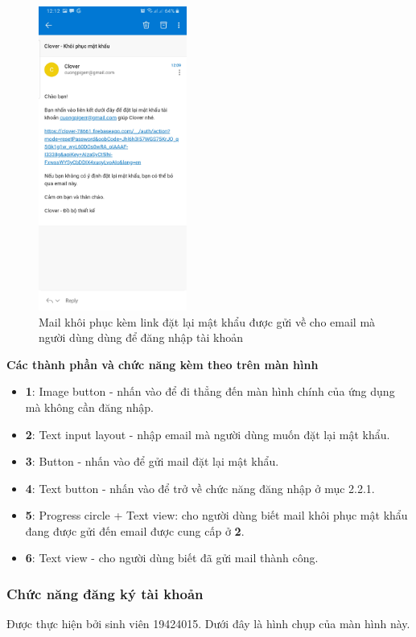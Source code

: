 \documentclass[12pt]{article}
\begin{document}
\begin{figure}[H]
    \centering
    \includegraphics[height=10cm]{images/09.png}
    \caption{Mail khôi phục kèm link đặt lại mật khẩu được gửi về cho email mà người dùng dùng để đăng nhập tài khoản}
\end{figure}

\indent \textbf{Các thành phần và chức năng kèm theo trên màn hình}
\begin{itemize}
    \item \textbf{1}: Image button - nhấn vào để đi thẳng đến màn hình chính của ứng dụng mà không cần đăng nhập.
    \item \textbf{2}: Text input layout - nhập email mà người dùng muốn đặt lại mật khẩu.
    \item \textbf{3}: Button - nhấn vào để gửi mail đặt lại mật khẩu.
    \item \textbf{4}: Text button - nhấn vào để trở về chức năng đăng nhập ở mục 2.2.1.
    \item \textbf{5}: Progress circle + Text view: cho người dùng biết mail khôi phục mật khẩu đang được gửi đến email được cung cấp ở \textbf{2}.
    \item \textbf{6}: Text view - cho người dùng biết đã gửi mail thành công.
\end{itemize}

\subsubsection{Chức năng đăng ký tài khoản}
Được thực hiện bởi sinh viên 19424015. Dưới đây là hình chụp của màn hình này.\\
\end{document}
